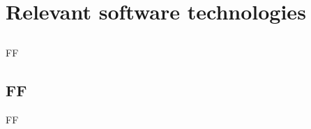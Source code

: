 \chapter{Relevant software technologies} \label{chap:relevant-sofware-technologies}



\section*{}

FF



\section{FF}

FF

